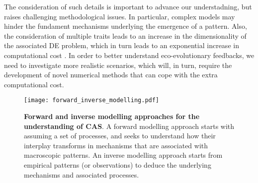 % 
% 
The consideration of such details is important to advance our understadning, but raises challenging methodological issues. 
% 
In particular, complex models may hinder the fundament mechanisms underlying the emergence of a pattern.
% 
Also, the consideration of multiple traits leads to an increase in the dimensionality of the associated DE problem, which in turn leads to an exponential increase in computational cost \citep{XXX}.
% 
In order to better understand eco-evolutionary feedbacks, we need to investigate more realistic scenarios, which will, in turn, require the development of novel numerical methods that can cope with the extra computational cost.
% 

\begin{figure}[t]
    \centering
    \texttt{[image: forward\_inverse\_modelling.pdf]}
    \caption{\textbf{Forward and inverse modelling approaches for the understanding of CAS}. A forward modelling approach starts with assuming a set of processes, and seeks to understand how their interplay transforms in mechanisms that are associated with macroscopic patterns. An inverse modelling approach starts from empirical patterns (or observations) to deduce the underlying mechanisms and associated processes.}
    \label{fig:forward_inverse_modelling}
\end{figure}

